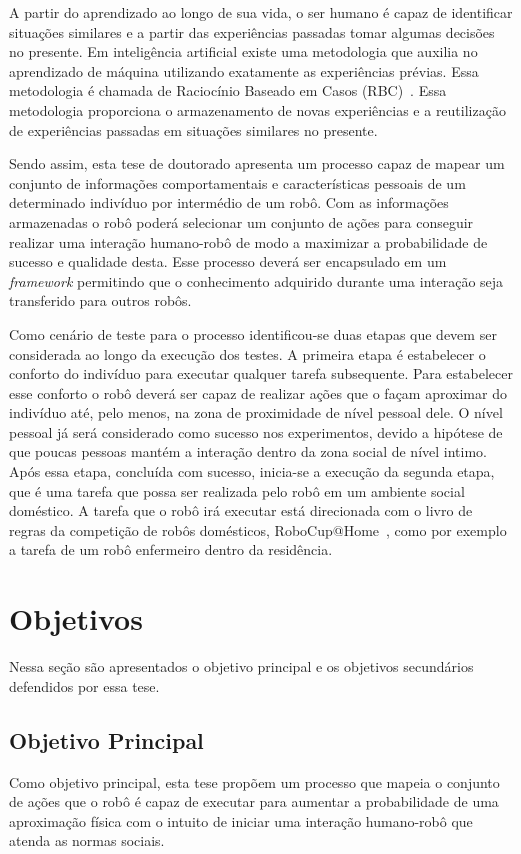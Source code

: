 A partir do aprendizado ao longo de sua vida, o ser humano é capaz de identificar situações similares e a partir das experiências passadas tomar algumas decisões no presente. Em inteligência artificial existe uma metodologia que auxilia no aprendizado de máquina utilizando exatamente as experiências prévias. Essa metodologia é chamada de Raciocínio Baseado em Casos (RBC)~\cite{Lopez:2013}. Essa metodologia proporciona o armazenamento de novas experiências e a reutilização de experiências passadas em situações similares no presente.

Sendo assim, esta tese de doutorado apresenta um processo capaz de mapear um conjunto de informações comportamentais e características pessoais de um determinado indivíduo por intermédio de um robô. Com as informações armazenadas o robô poderá selecionar um conjunto de ações para conseguir realizar uma interação humano-robô de modo a maximizar a probabilidade de sucesso e qualidade desta. Esse processo deverá ser encapsulado em um \emph{framework} permitindo que o conhecimento adquirido durante uma interação seja transferido para outros robôs.

Como cenário de teste para o processo identificou-se duas etapas que devem ser considerada ao longo da execução dos testes. A primeira etapa é estabelecer o conforto do indivíduo para executar qualquer tarefa subsequente. Para estabelecer esse conforto o robô deverá ser capaz de realizar ações que o façam aproximar do indivíduo até, pelo menos, na zona de proximidade de nível pessoal dele. O nível pessoal já será considerado como sucesso nos experimentos, devido a hipótese de que poucas pessoas mantém a interação dentro da zona social de nível intimo. Após essa etapa, concluída com sucesso, inicia-se a execução da segunda etapa, que é uma tarefa que possa ser realizada pelo robô em um ambiente social doméstico. A tarefa que o robô irá executar está direcionada com o livro de regras da competição de robôs domésticos, RoboCup@Home~\cite{Robocup:2015}, como por exemplo a tarefa de um robô enfermeiro dentro da residência.

\section{Objetivos}
Nessa seção são apresentados o objetivo principal e os objetivos secundários defendidos por essa tese.

\subsection{Objetivo Principal}
Como objetivo principal, esta tese propõem um processo que mapeia o conjunto de ações que o robô é capaz de executar para aumentar a probabilidade de uma aproximação física com o intuito de iniciar uma interação humano-robô que atenda as normas sociais.


